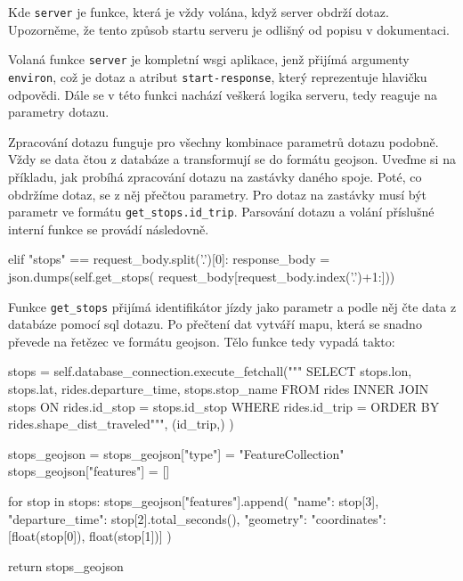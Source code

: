 Kde \verb-server- je funkce, která je vždy volána, když server obdrží dotaz. Upozorněme, že tento způsob startu serveru je odlišný od popisu v dokumentaci.


\bigbreak


Volaná funkce \verb-server- je kompletní \gls{wsgi} aplikace, jenž přijímá argumenty \verb-environ-, což je dotaz a atribut \verb:start-response:, který reprezentuje hlavičku odpovědi. Dále se v této funkci nachází veškerá logika serveru, tedy reaguje na parametry dotazu.


\bigbreak


Zpracování dotazu funguje pro všechny kombinace parametrů dotazu podobně. Vždy se data čtou z databáze a transformují se do formátu \gls{geojson}. Uveďme si na příkladu, jak probíhá zpracování dotazu na zastávky daného spoje. Poté, co obdržíme dotaz, se z něj přečtou parametry. Pro dotaz na zastávky musí být parametr ve formátu \verb-get_stops.id_trip-. Parsování dotazu a volání příslušné interní funkce se provádí následovně.


\begin{code}[frame=none]
elif "stops" == request_body.split('.')[0]:
  response_body = json.dumps(self.get_stops(
    request_body[request_body.index('.')+1:]))
\end{code}


Funkce \verb-get_stops- přijímá identifikátor jízdy jako parametr a podle něj čte data z databáze pomocí \gls{sql} dotazu. Po přečtení dat vytváří mapu, která se snadno převede na řetězec ve formátu \gls{geojson}. Tělo funkce tedy vypadá takto:


\begin{code}[frame=none]
stops = self.database_connection.execute_fetchall("""
SELECT
  stops.lon,
  stops.lat,
  rides.departure_time,
  stops.stop_name
FROM rides
INNER JOIN stops ON rides.id_stop = stops.id_stop
WHERE rides.id_trip = %
ORDER BY rides.shape_dist_traveled""",
(id_trip,)
)


stops_geojson = {}
stops_geojson["type"] = "FeatureCollection"
stops_geojson["features"] = []


for stop in stops:
stops_geojson["features"].append({
  "name": stop[3],
  "departure_time": stop[2].total_seconds(),
  "geometry": {
    "coordinates": [float(stop[0]), float(stop[1])]
  }
})


return stops_geojson
\end{code}






































